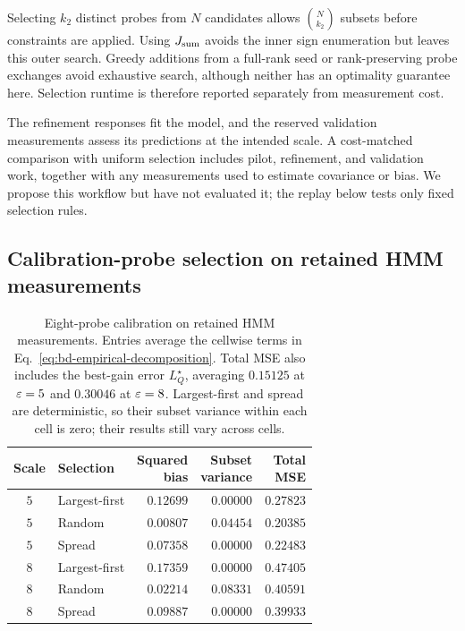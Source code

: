 Selecting $k_2$ distinct probes from $N$ candidates allows $\binom{N}{k_2}$
subsets before constraints are applied. Using $J_{\rm sum}$ avoids the inner
sign enumeration but leaves this outer search. Greedy additions from a
full-rank seed or rank-preserving probe exchanges avoid exhaustive search,
although neither has an optimality guarantee here. Selection runtime is
therefore reported separately from measurement cost.

The refinement responses fit the model, and the reserved validation
measurements assess its predictions at the intended scale. A cost-matched
comparison with uniform selection includes pilot, refinement, and validation
work, together with any measurements used to estimate covariance or bias.
We propose this workflow but have not evaluated it; the replay below tests
only fixed selection rules.

\subsection{Calibration-probe selection on retained HMM measurements}\label{app:selector-replay}

\begin{table}[htbp]
\centering
\setlength{\tabcolsep}{3pt}
\begin{tabular}{clrrr}
\toprule
Scale & Selection & \shortstack{Squared\\bias} & \shortstack{Subset\\variance} & \shortstack{Total\\MSE} \\
\midrule
$5$ & Largest-first & $0.12699$ & $0.00000$ & $0.27823$ \\
$5$ & Random        & $0.00807$ & $0.04454$ & $0.20385$ \\
$5$ & Spread        & $0.07358$ & $0.00000$ & $0.22483$ \\
\midrule
$8$ & Largest-first & $0.17359$ & $0.00000$ & $0.47405$ \\
$8$ & Random        & $0.02214$ & $0.08331$ & $0.40591$ \\
$8$ & Spread        & $0.09887$ & $0.00000$ & $0.39933$ \\
\bottomrule
\end{tabular}
\caption{Eight-probe calibration on retained HMM measurements. Entries average
the cellwise terms in Eq.~\eqref{eq:bd-empirical-decomposition}. Total MSE also
includes the best-gain error $L_Q^\star$, averaging $0.15125$ at $\varepsilon=5$ and
$0.30046$ at $\varepsilon=8$. Largest-first and spread are deterministic,
so their subset variance within each cell is zero; their results still vary
across cells.}
\label{tab:selector-decomposition}
\end{table}

